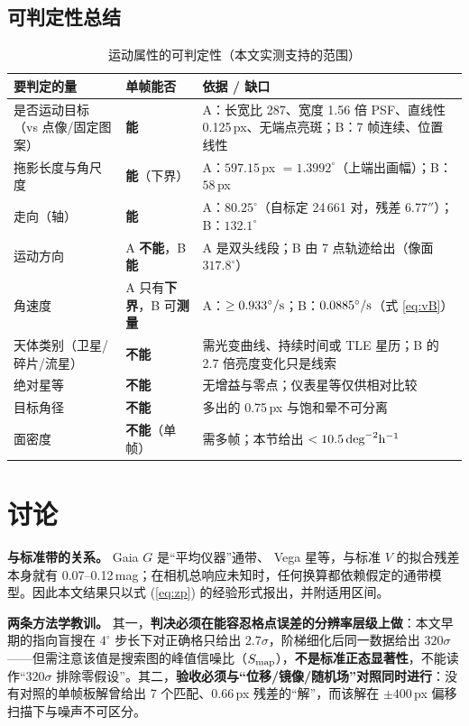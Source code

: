 \documentclass[11pt,a4paper]{ctexart}
\begin{document}
\subsection{可判定性总结}
\begin{table}[htbp]\centering\small
\caption{运动属性的可判定性（本文实测支持的范围）}\label{tab:decide}
\begin{tabular}{@{}p{}p{}p{}@{}}
\toprule
要判定的量 & 单帧能否 & 依据 / 缺口\\
\midrule
是否运动目标（vs 点像/固定图案） & \textbf{能} & A：长宽比 287、宽度 1.56 倍 PSF、直线性 0.125\,px、无端点亮斑；B：7 帧连续、位置线性\\
拖影长度与角尺度 & \textbf{能}（下界） & A：$597.15$\,px $=1.3992^\circ$（上端出画幅）；B：$58$\,px\\
走向（轴） & \textbf{能} & A：$80.25^\circ$（自标定 24\,661 对，残差 6.77$''$）；B：$132.1^\circ$\\
运动方向 & A \textbf{不能}，B \textbf{能} & A 是双头线段；B 由 7 点轨迹给出（像面 $317.8^\circ$）\\
角速度 & A 只有\textbf{下界}，B 可\textbf{测量} & A：$\ge0.933^\circ/{\rm s}$；B：$0.0885^\circ/{\rm s}$（式 \ref{eq:vB}）\\
天体类别（卫星/碎片/流星） & \textbf{不能} & 需光变曲线、持续时间或 TLE 星历；B 的 2.7 倍亮度变化只是线索\\
绝对星等 & \textbf{不能} & 无增益与零点；仪表星等仅供相对比较\\
目标角径 & \textbf{不能} & 多出的 0.75\,px 与饱和晕不可分离\\
面密度 & \textbf{不能}（单帧） & 需多帧；本节给出 $<10.5\,{\rm deg}^{-2}{\rm h}^{-1}$\\
\bottomrule
\end{tabular}
\end{table}

\section{讨论}\label{sec:discuss}
\noindent\textbf{与标准带的关系。} Gaia $G$ 是“平均仪器”通带、 Vega 星等，与标准 $V$ 的拟合残差本身就有 0.07--0.12\,mag；在相机总响应未知时，任何换算都依赖假定的通带模型。因此本文结果只以式 (\ref{eq:zp}) 的经验形式报出，并附适用区间。

\noindent\textbf{两条方法学教训。} 其一，\textbf{判决必须在能容忍格点误差的分辨率层级上做}：本文早期的指向盲搜在 $4^\circ$ 步长下对正确格只给出 $2.7\sigma$，阶梯细化后同一数据给出 $320\sigma$——但需注意该值是搜索图的峰值信噪比（$S_{\rm map}$），\textbf{不是标准正态显著性}，不能读作“$320\sigma$ 排除零假设”。其二，\textbf{验收必须与“位移/镜像/随机场”对照同时进行}：没有对照的单帧板解曾给出 7 个匹配、0.66\,px 残差的“解”，而该解在 $\pm400$\,px 偏移扫描下与噪声不可区分。
\end{document}
